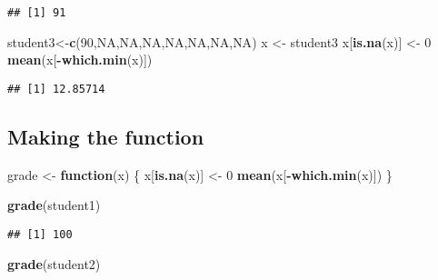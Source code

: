 \documentclass[
]{article}
\newenvironment{Shaded}{\begin{snugshade}}{\end{snugshade}}
\newcommand{\ConstantTok}[1]{\textcolor[rgb]{0.56,0.35,0.01}{#1}}
\newcommand{\ControlFlowTok}[1]{\textcolor[rgb]{0.13,0.29,0.53}{\textbf{#1}}}
\newcommand{\DecValTok}[1]{\textcolor[rgb]{0.00,0.00,0.81}{#1}}
\newcommand{\FunctionTok}[1]{\textcolor[rgb]{0.13,0.29,0.53}{\textbf{#1}}}
\newcommand{\NormalTok}[1]{#1}
\newcommand{\OtherTok}[1]{\textcolor[rgb]{0.56,0.35,0.01}{#1}}
\newcommand{\SpecialCharTok}[1]{\textcolor[rgb]{0.81,0.36,0.00}{\textbf{#1}}}
\begin{document}
\begin{verbatim}
## [1] 91
\end{verbatim}

\begin{Shaded}
\begin{Highlighting}[]
\NormalTok{student3}\OtherTok{\textless{}{-}}\FunctionTok{c}\NormalTok{(}\DecValTok{90}\NormalTok{,}\ConstantTok{NA}\NormalTok{,}\ConstantTok{NA}\NormalTok{,}\ConstantTok{NA}\NormalTok{,}\ConstantTok{NA}\NormalTok{,}\ConstantTok{NA}\NormalTok{,}\ConstantTok{NA}\NormalTok{,}\ConstantTok{NA}\NormalTok{)}
\NormalTok{x }\OtherTok{\textless{}{-}}\NormalTok{  student3}
\NormalTok{x[}\FunctionTok{is.na}\NormalTok{(x)] }\OtherTok{\textless{}{-}} \DecValTok{0}
\FunctionTok{mean}\NormalTok{(x[}\SpecialCharTok{{-}}\FunctionTok{which.min}\NormalTok{(x)])}
\end{Highlighting}
\end{Shaded}

\begin{verbatim}
## [1] 12.85714
\end{verbatim}

\hypertarget{making-the-function}{%
\subsection{Making the function}\label{making-the-function}}

\begin{Shaded}
\begin{Highlighting}[]
\NormalTok{grade }\OtherTok{\textless{}{-}} \ControlFlowTok{function}\NormalTok{(x) \{}
\NormalTok{  x[}\FunctionTok{is.na}\NormalTok{(x)] }\OtherTok{\textless{}{-}} \DecValTok{0}
  \FunctionTok{mean}\NormalTok{(x[}\SpecialCharTok{{-}}\FunctionTok{which.min}\NormalTok{(x)])}
\NormalTok{\}}
\end{Highlighting}
\end{Shaded}

\begin{Shaded}
\begin{Highlighting}[]
\FunctionTok{grade}\NormalTok{(student1)}
\end{Highlighting}
\end{Shaded}

\begin{verbatim}
## [1] 100
\end{verbatim}

\begin{Shaded}
\begin{Highlighting}[]
\FunctionTok{grade}\NormalTok{(student2)}
\end{Highlighting}
\end{Shaded}
\end{document}
